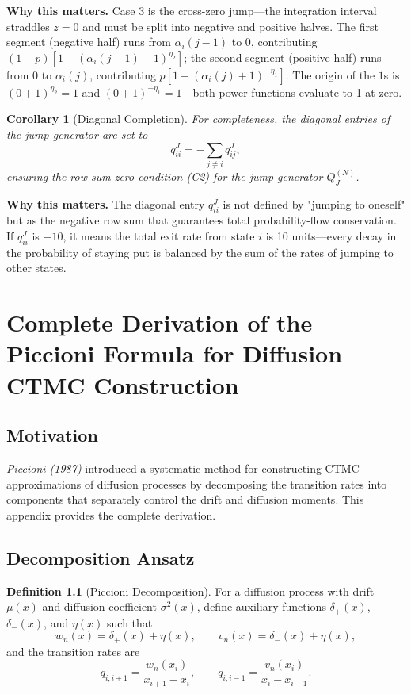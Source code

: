 \documentclass[11pt,a4paper,openany]{book}
\theoremstyle{definition}
\newtheorem{definition}{Definition}[chapter]
\theoremstyle{plain}
\newtheorem{corollary}[theorem]{Corollary}
\theoremstyle{remark}
\newcommand{\1}{\mathbbm{1}}
\begin{document}
\medskip
\noindent\textbf{Why this matters.} Case 3 is the cross-zero jump---the integration interval straddles $z=0$ and must be split into negative and positive halves. The first segment (negative half) runs from $\alpha_i(j-1)$ to 0, contributing $(1-p)[1 - (\alpha_i(j-1)+1)^{\eta_2}]$; the second segment (positive half) runs from 0 to $\alpha_i(j)$, contributing $p[1 - (\alpha_i(j)+1)^{-\eta_1}]$. The origin of the $1$s is $(0+1)^{\eta_2} = 1$ and $(0+1)^{-\eta_1} = 1$---both power functions evaluate to 1 at zero.

\begin{corollary}[Diagonal Completion]
For completeness, the diagonal entries of the jump generator are set to
\[
q_{ii}^{J} = -\sum_{j \neq i} q_{ij}^{J},
\]
ensuring the row-sum-zero condition (C2) for the jump generator $Q_{J}^{(N)}$.
\end{corollary}

\medskip
\noindent\textbf{Why this matters.} The diagonal entry $q_{ii}^J$ is not defined by "jumping to oneself" but as the negative row sum that guarantees total probability-flow conservation. If $q_{ii}^J$ is $-10$, it means the total exit rate from state $i$ is 10 units---every decay in the probability of staying put is balanced by the sum of the rates of jumping to other states.

\chapter{Complete Derivation of the Piccioni Formula for Diffusion CTMC Construction}

\section{Motivation}

\textit{Piccioni (1987)} introduced a systematic method for constructing CTMC approximations of diffusion processes by decomposing the transition rates into components that separately control the drift and diffusion moments. This appendix provides the complete derivation.

\section{Decomposition Ansatz}

\begin{definition}[Piccioni Decomposition]
For a diffusion process with drift $\mu(x)$ and diffusion coefficient $\sigma^{2}(x)$, define auxiliary functions $\delta_{+}(x)$, $\delta_{-}(x)$, and $\eta(x)$ such that
\[
w_{n}(x) = \delta_{+}(x) + \eta(x), \qquad v_{n}(x) = \delta_{-}(x) + \eta(x),
\]
and the transition rates are
\[
q_{i,i+1} = \frac{w_{n}(x_{i})}{x_{i+1} - x_{i}}, \qquad q_{i,i-1} = \frac{v_{n}(x_{i})}{x_{i} - x_{i-1}}.
\]
\end{definition}
\end{document}
